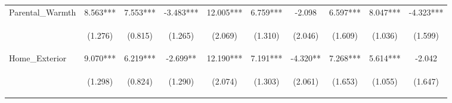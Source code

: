 \begin{tabular}{lccccccccc}
\noalign{\smallskip}Parental_Warmth & 8.563*** & 7.553*** & -3.483*** & 12.005*** & 6.759*** & -2.098 & 6.597*** & 8.047*** & -4.323***\\
 & \begin{footnotesize}(1.276)\end{footnotesize} & \begin{footnotesize}(0.815)\end{footnotesize} & \begin{footnotesize}(1.265)\end{footnotesize} & \begin{footnotesize}(2.069)\end{footnotesize} & \begin{footnotesize}(1.310)\end{footnotesize} & \begin{footnotesize}(2.046)\end{footnotesize} & \begin{footnotesize}(1.609)\end{footnotesize} & \begin{footnotesize}(1.036)\end{footnotesize} & \begin{footnotesize}(1.599)\end{footnotesize}\\
\noalign{\smallskip}Home_Exterior & 9.070*** & 6.219*** & -2.699** & 12.190*** & 7.191*** & -4.320** & 7.268*** & 5.614*** & -2.042\\
 & \begin{footnotesize}(1.298)\end{footnotesize} & \begin{footnotesize}(0.824)\end{footnotesize} & \begin{footnotesize}(1.290)\end{footnotesize} & \begin{footnotesize}(2.074)\end{footnotesize} & \begin{footnotesize}(1.303)\end{footnotesize} & \begin{footnotesize}(2.061)\end{footnotesize} & \begin{footnotesize}(1.653)\end{footnotesize} & \begin{footnotesize}(1.055)\end{footnotesize} & \begin{footnotesize}(1.647)\end{footnotesize}\\

\end{tabular}
